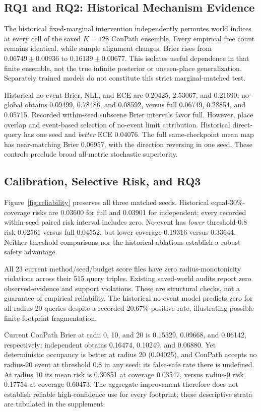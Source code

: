 \documentclass[conference,letterpaper,10pt]{IEEEtran}
\begin{document}
\subsection{RQ1 and RQ2: Historical Mechanism Evidence}
The historical fixed-marginal intervention independently permutes world indices at every cell of the saved $K=128$ ConPath ensemble. Every empirical free count remains identical, while sample alignment changes. Brier rises from $0.06749\pm0.00936$ to $0.16139\pm0.00677$. This isolates useful dependence in that finite ensemble, not the true infinite posterior or unseen-place generalization. Separately trained models do not constitute this strict marginal-matched test.

Historical no-event Brier, NLL, and ECE are 0.20425, 2.53067, and 0.21690; no-global obtains 0.09499, 0.78486, and 0.08592, versus full 0.06749, 0.28854, and 0.05715. Recorded within-seed subscene Brier intervals favor full. However, place overlap and event-based selection of no-event limit attribution. Historical direct-query has one seed and \emph{better} ECE 0.04076. The full same-checkpoint mean map has near-matching Brier 0.06957, with the direction reversing in one seed. These controls preclude broad all-metric stochastic superiority.

\subsection{Calibration, Selective Risk, and RQ3}
Figure~\ref{fig:reliability} preserves all three matched seeds. Historical equal-30\%-coverage risks are 0.03600 for full and 0.03901 for independent; every recorded within-seed paired risk interval includes zero. No-event has \emph{lower} threshold-0.8 risk 0.02561 versus full 0.04552, but lower coverage 0.19316 versus 0.33644. Neither threshold comparisons nor the historical ablations establish a robust safety advantage.



All 23 current method/seed/budget score files have zero radius-monotonicity violations across their 515 query triples. Existing saved-world audits report zero observed-evidence and support violations. These are structural checks, not a guarantee of empirical reliability. The historical no-event model predicts zero for all radius-20 queries despite a recorded 20.67\% positive rate, illustrating possible finite-footprint fragmentation.

Current ConPath Brier at radii 0, 10, and 20 is 0.15329, 0.09668, and 0.06142, respectively; independent obtains 0.16474, 0.10249, and 0.06880. Yet deterministic occupancy is better at radius 20 (0.04025), and ConPath accepts no radius-20 event at threshold 0.8 in any seed: its false-safe rate there is undefined. At radius 10 its mean risk is 0.30851 at coverage 0.03547, versus radius-0 risk 0.17754 at coverage 0.60473. The aggregate improvement therefore does not establish reliable high-confidence use for every footprint; these descriptive strata are tabulated in the supplement.
\end{document}
